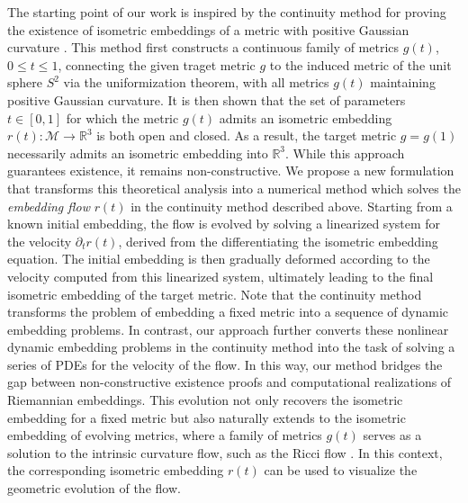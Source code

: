 \documentclass[11pt,a4paper,oneside,reqno]{amsart}
\theoremstyle{definition}
\theoremstyle{plain}
\numberwithin{theorem}{section}
\numberwithin{proposition}{section}
\numberwithin{lemma}{section}
\numberwithin{equation}{section}
\newcommand{\Man}{\mathcal{M}}
\newcommand{\GZ}[1]{{[\color{magenta}GZ:~#1}]}
\begin{document}
The starting point of our work is inspired by the continuity method for proving the existence of isometric embeddings of a metric with positive Gaussian curvature \cite{Nirenberg1953, han2006isometric}. This method first constructs a continuous family of metrics \( g(t) \), \( 0 \le t \le 1 \), connecting the given traget metric \( g \) to the induced metric of the unit sphere \( S^2 \) via the uniformization theorem, with all metrics \( g(t) \) maintaining positive Gaussian curvature. It is then shown that the set of parameters \( t \in [0,1] \) for which the metric \( g(t) \) admits an isometric embedding \( r(t): \Man \to \mathbb{R}^3 \) is both open and closed. As a result, the target metric \( g = g(1) \) necessarily admits an isometric embedding into \( \mathbb{R}^3 \). While this approach guarantees existence, it remains non-constructive. 
We propose a new formulation that transforms this theoretical analysis into a numerical method which solves the \emph{embedding flow} \( r(t) \) in the continuity method described above. Starting from a known initial embedding, the flow is evolved by solving a linearized system for the velocity \( \partial_t r(t) \), derived from the differentiating the isometric embedding equation. The initial embedding is then gradually deformed according to the velocity computed from this linearized system, ultimately leading to the final isometric embedding of the target metric.
Note that the continuity method transforms the problem of embedding a fixed metric into a sequence of dynamic embedding problems. In contrast, our approach further converts these nonlinear dynamic embedding problems in the continuity method into the task of solving a series of PDEs for the velocity of the flow. In this way, our method bridges the gap between non-constructive existence proofs and computational realizations of Riemannian embeddings. 
This evolution not only recovers the isometric embedding for a fixed metric but also naturally extends to the isometric embedding of evolving metrics, where a family of metrics \( g(t) \) serves as a solution to the intrinsic curvature flow, such as the Ricci flow \cite{gawlik2019finite,gao2025ricci, rubinstein2005visualizing}. In this context, the corresponding isometric embedding \( r(t) \) can be used to visualize the geometric evolution of the flow.

\end{document}
